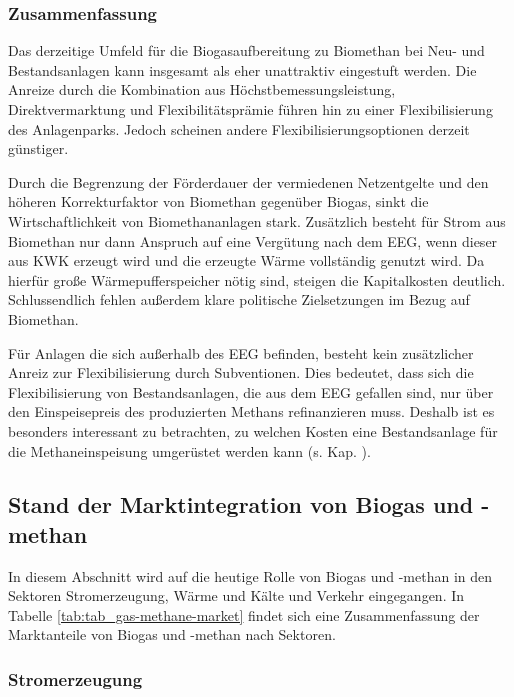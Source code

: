 \subsubsection{Zusammenfassung}

Das derzeitige Umfeld für die Biogasaufbereitung zu Biomethan bei Neu- und Bestandsanlagen kann insgesamt als eher unattraktiv eingestuft werden. Die Anreize durch die Kombination aus Höchstbemessungsleistung, Direktvermarktung und Flexibilitätsprämie führen hin zu einer Flexibilisierung des Anlagenparks. Jedoch scheinen andere Flexibilisierungsoptionen derzeit günstiger.\smallskip

Durch die Begrenzung der Förderdauer der vermiedenen Netzentgelte und den höheren Korrekturfaktor von Biomethan gegenüber Biogas, sinkt die Wirtschaftlichkeit von Biomethananlagen stark. Zusätzlich besteht für Strom aus Biomethan nur dann Anspruch auf eine Vergütung nach dem \gls{EEG}, wenn dieser aus \gls{KWK} erzeugt wird und die erzeugte Wärme vollständig genutzt wird. Da hierfür große Wärmepufferspeicher nötig sind, steigen die Kapitalkosten deutlich. Schlussendlich fehlen außerdem klare politische Zielsetzungen im Bezug auf Biomethan. \smallskip

Für Anlagen die sich außerhalb des \gls{EEG} befinden, besteht kein zusätzlicher Anreiz zur Flexibilisierung durch Subventionen. Dies bedeutet, dass sich die Flexibilisierung von Bestandsanlagen, die aus dem \gls{EEG} gefallen sind, nur über den Einspeisepreis des produzierten Methans refinanzieren muss. Deshalb ist es besonders interessant zu betrachten, zu welchen Kosten eine Bestandsanlage für die Methaneinspeisung umgerüstet werden kann (s. Kap. ). %

\subsection{Stand der Marktintegration von Biogas und -methan}

In diesem Abschnitt wird auf die heutige Rolle von Biogas und -methan in den Sektoren Stromerzeugung, Wärme und Kälte und Verkehr eingegangen. In Tabelle \ref{tab:tab_gas-methane-market} findet sich eine Zusammenfassung der Marktanteile von Biogas und -methan nach Sektoren.




\subsubsection{Stromerzeugung}

